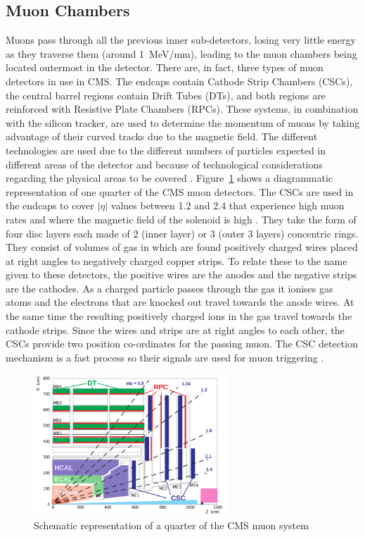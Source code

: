 \subsection{Muon Chambers}
\label{ss:Muon_Chambers}
Muons pass through all the previous inner sub-detectors, losing very little energy as they traverse them
(around 1~MeV/mm), leading to the muon chambers being located outermost in the detector. There are, in fact,
three types of muon detectors in use in CMS. The endcaps contain Cathode Strip Chambers (CSCs), the central
barrel regions contain Drift Tubes (DTs), and both regions are reinforced with Resistive Plate Chambers
(RPCs). These systems, in combination with the silicon tracker, are used to determine the momentum of muons by
taking advantage of their curved tracks due to the magnetic field. The different technologies are used due to
the different numbers of particles expected in different areas of the detector and because of technological
considerations regarding the physical areas to be covered \cite{CMS_TDR1}.
Figure~\ref{fig:CMS_muon_system} shows a diagrammatic representation of one quarter of the CMS muon detectors.
The CSCs are used in the endcaps to cover $|\eta|$ values between 1.2 and 2.4 that experience high muon rates
and where the magnetic field of the solenoid is high \cite{CMS_TDR1}. They take the form of four disc layers
each made of 2 (inner layer) or 3 (outer 3 layers) concentric rings. They consist of volumes of gas in which
are found positively charged wires placed at right angles to negatively charged copper strips. To relate these
to the name given to these detectors, the positive wires are the anodes and the negative strips are the
cathodes. As a charged particle passes through the gas it ionises gas atoms and the electrons that are knocked
out travel towards the anode wires. At the same time the resulting positively charged ions in the gas travel
towards the cathode strips. Since the wires and strips are at right angles to each other, the CSCs provide two
position co-ordinates for the passing muon. The CSC detection mechanism is a fast process so their signals are
used for muon triggering \cite{CMS_experiment}.
 
\begin{figure}[hbtp]
   \centering
     \includegraphics[width=0.65\textwidth]{Chapters/03_Detector/Images/MuonSys-mod3.png}\hfill
     \caption{Schematic representation of a quarter of the CMS muon system \cite{Muon_tracking}}
     \label{fig:CMS_muon_system}
\end{figure}

